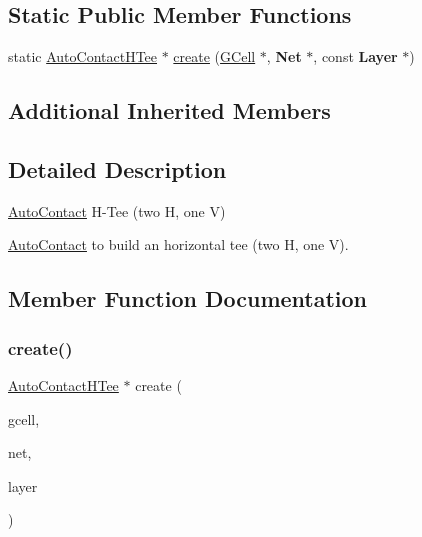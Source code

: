 \subsection*{Static Public Member Functions}
\begin{DoxyCompactItemize}
\item 
static \mbox{\hyperlink{classKatabatic_1_1AutoContactHTee}{Auto\+Contact\+H\+Tee}} $\ast$ \mbox{\hyperlink{classKatabatic_1_1AutoContactHTee_a9b42579ac2487765c83e31f7ca3ee562}{create}} (\mbox{\hyperlink{classKatabatic_1_1GCell}{G\+Cell}} $\ast$, \textbf{ Net} $\ast$, const \textbf{ Layer} $\ast$)
\end{DoxyCompactItemize}
\subsection*{Additional Inherited Members}


\subsection{Detailed Description}
\mbox{\hyperlink{classKatabatic_1_1AutoContact}{Auto\+Contact}} H-\/\+Tee (two H, one V) 

\mbox{\hyperlink{classKatabatic_1_1AutoContact}{Auto\+Contact}} to build an horizontal tee (two H, one V). 

\subsection{Member Function Documentation}
\mbox{\label{classKatabatic_1_1AutoContactHTee_a9b42579ac2487765c83e31f7ca3ee562}} 
\subsubsection{\texorpdfstring{create()}{create()}}
{\footnotesize\ttfamily \mbox{\hyperlink{classKatabatic_1_1AutoContactHTee}{Auto\+Contact\+H\+Tee}} $\ast$ create (\begin{DoxyParamCaption}\item[{\mbox{\hyperlink{classKatabatic_1_1GCell}{G\+Cell}} $\ast$}]{gcell,  }\item[{\textbf{ Net} $\ast$}]{net,  }\item[{const \textbf{ Layer} $\ast$}]{layer }\end{DoxyParamCaption})\hspace{0.3cm}{\ttfamily [static]}}


